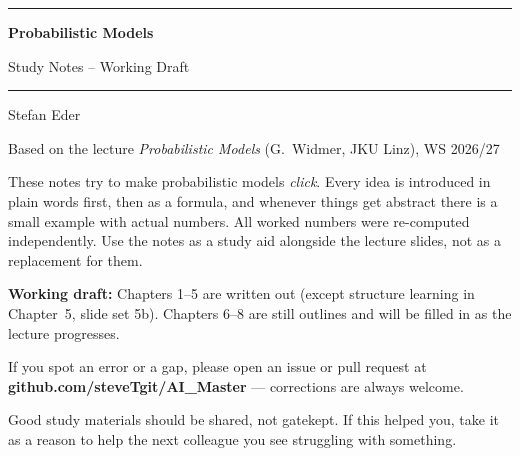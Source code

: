 \documentclass[11pt, oneside]{book}
\newcommand{\coursetitle}{Probabilistic Models}
\newcommand{\documenttype}{Study Notes -- Working Draft}
\newcommand{\authorname}{Stefan Eder}
\newcommand{\basedon}{Based on the lecture \emph{Probabilistic Models} (G.~Widmer, JKU Linz), WS 2026/27}
\begin{document}
\frontmatter  %


\thispagestyle{empty}
\vspace*{1.8cm}

\begin{center}
  {\color{accent}\rule{\linewidth}{1.8pt}}
  \vspace{0.65cm}

  {\fontsize{28}{34}\selectfont\bfseries\color{accent}\coursetitle\par}
  \vspace{0.25cm}
  {\large\color{gray!80!black}\documenttype\par}

  \vspace{0.55cm}
  {\color{accent!35}\rule{\linewidth}{0.5pt}}
  \vspace{0.55cm}

  {\large\authorname\par}
  \vspace{0.2cm}
  {\small\color{gray!70}\basedon\par}
\end{center}

\vspace{1.6cm}

\begin{center}
\begin{minipage}{0.84\textwidth}
  \small\color{gray!80!black}
  These notes try to make probabilistic models \emph{click}. Every idea is
  introduced in plain words first, then as a formula, and whenever things get
  abstract there is a small example with actual numbers. All worked numbers
  were re-computed independently.
  Use the notes as a study aid alongside the lecture slides, not as a
  replacement for them.

  \medskip
  \textbf{Working draft:} Chapters 1--5 are written out (except structure
  learning in Chapter~5, slide set 5b). Chapters 6--8 are still outlines and
  will be filled in as the lecture progresses.

  \medskip
  If you spot an error or a gap, please open an issue or pull request at
  \textbf{github.com/steveTgit/AI\_Master} --- corrections are always welcome.

  \medskip
  \color{gray!60!black}
  Good study materials should be shared, not gatekept.
  If this helped you, take it as a reason to help the next colleague you see struggling with something.
\end{minipage}
\end{center}
\end{document}
